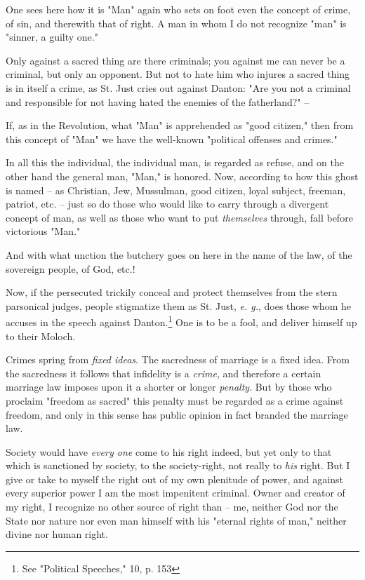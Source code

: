 \documentclass[a4paper]{book}
\begin{document}
One sees here how it is "{}Man"{} again who sets on foot even the concept of 
crime, of sin, and therewith that of right. A man in whom I do not recognize 
"{}man"{} is "{}sinner, a guilty one."{}

Only against a sacred thing are there criminals; you against me can never be a 
criminal, but only an opponent. But not to hate him who injures a sacred thing 
is in itself a crime, as St. Just cries out against Danton: "{}Are you not a 
criminal and responsible for not having hated the enemies of the 
fatherland?"{} --

If, as in the Revolution, what "{}Man"{} is apprehended as "{}good citizen,"{} 
then from this concept of "{}Man"{} we have the well-known "{}political 
offenses and crimes."{}

In all this the individual, the individual man, is regarded as refuse, and on 
the other hand the general man, "{}Man,"{} is honored. Now, according to how 
this ghost is named -- as Christian, Jew, Mussulman, good citizen, loyal 
subject, freeman, patriot, etc. -- just so do those who would like to carry 
through a divergent concept of man, as well as those who want to put 
\textit{themselves} through, fall before victorious "{}Man."{}

And with what unction the butchery goes on here in the name of the law, of the 
sovereign people, of God, etc.!

Now, if the persecuted trickily conceal and protect themselves from the stern 
parsonical judges, people stigmatize them as St. Just, \textit{e. g.}, does 
those whom he accuses in the speech against Danton.\footnote{See "{}Political 
Speeches,"{} 10, p. 153} One is to be a fool, and deliver himself up to their 
Moloch.

Crimes spring from \textit{fixed ideas}. The sacredness of marriage is a fixed 
idea. From the sacredness it follows that infidelity is a \textit{crime}, and 
therefore a certain marriage law imposes upon it a shorter or longer 
\textit{penalty}. But by those who proclaim "{}freedom as sacred"{} this 
penalty must be regarded as a crime against freedom, and only in this sense 
has public opinion in fact branded the marriage law.

Society would have \textit{every one} come to his right indeed, but yet only 
to that which is sanctioned by society, to the society-right, not really to 
\textit{his} right. But I give or take to myself the right out of my own 
plenitude of power, and against every superior power I am the most impenitent 
criminal. Owner and creator of my right, I recognize no other source of right 
than -- me, neither God nor the State nor nature nor even man himself with his 
"{}eternal rights of man,"{} neither divine nor human right.
\end{document}
